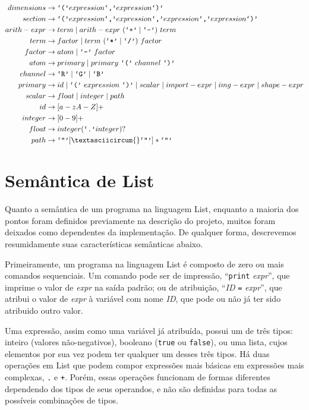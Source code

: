 \documentclass{article}
\newcommand{\literal}[1]{\text{\texttt{`#1'}}}
\newcommand{\tsp}{\text{ }}
\begin{document}
\begin{align*}
dimensions &\rightarrow \literal{(} expression \literal{,} expression \literal{)}\\
section &\rightarrow \literal{(} expression \literal{,} expression \literal{,} expression \literal{,} expression \literal{)}\\
arith-expr &\rightarrow term \mid arith-expr \tsp (\literal{+} \mid \literal{-}) \tsp term\\
term &\rightarrow factor \mid term \tsp (\literal{*} \mid \literal{/}) \tsp factor\\
factor &\rightarrow atom \mid \literal{-} \tsp factor\\
atom &\rightarrow primary \mid primary \tsp \literal{(} \tsp channel \tsp \literal{)}\\
channel &\rightarrow \literal{R} \mid \literal{G} \mid \literal{B}\\
primary &\rightarrow id \mid \literal{(} \tsp expression \tsp \literal{)} \mid scalar \mid import-expr \mid img-expr \mid shape-expr\\
scalar &\rightarrow float \mid integer \mid path\\
id &\rightarrow [a-zA-Z]+\\
integer &\rightarrow [0-9]+\\
float &\rightarrow integer (\literal{.} integer)?\\
path &\rightarrow \literal{"} [\textasciicircum{}\literal{"}]* \literal{"}
\end{align*}


\section{Semântica de List}
\label{sec:semantica}
Quanto a semântica de um programa na linguagem List, enquanto a maioria dos pontos foram definidos previamente na descrição do projeto, muitos foram deixados como dependentes da implementação. De qualquer forma, descrevemos resumidamente suas características semânticas abaixo.

Primeiramente, um programa na linguagem List é composto de zero ou mais comandos sequenciais. Um comando pode ser de impressão, ``\texttt{print} \textit{expr}'', que imprime o valor de \textit{expr} na saída padrão; ou de atribuição, ``\textit{ID} \texttt{=} \textit{expr}'', que atribui o valor de \textit{expr} à variável com nome \textit{ID}, que pode ou não já ter sido atribuido outro valor.

Uma expressão, assim como uma variável já atribuída, possui um de três tipos: inteiro (valores não-negativos), booleano (\texttt{true} ou \texttt{false}), ou uma lista, cujos elementos por sua vez podem ter qualquer um desses três tipos. Há duas operações em List que podem compor expressões mais básicas em expressões mais complexas, \texttt{.} e \texttt{+}. Porém, essas operações funcionam de formas diferentes dependendo dos tipos de seus operandos, e não são definidas para todas as possíveis combinações de tipos.
\end{document}
